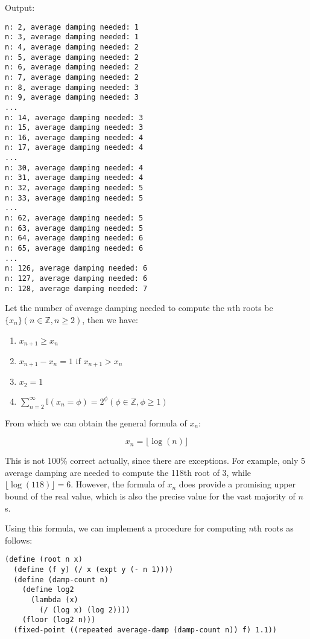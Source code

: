 \documentclass[../main.tex]{subfiles}
\begin{document}
Output:

\begin{lstlisting}
n: 2, average damping needed: 1
n: 3, average damping needed: 1
n: 4, average damping needed: 2
n: 5, average damping needed: 2
n: 6, average damping needed: 2
n: 7, average damping needed: 2
n: 8, average damping needed: 3
n: 9, average damping needed: 3
...
n: 14, average damping needed: 3
n: 15, average damping needed: 3
n: 16, average damping needed: 4
n: 17, average damping needed: 4
...
n: 30, average damping needed: 4
n: 31, average damping needed: 4
n: 32, average damping needed: 5
n: 33, average damping needed: 5
...
n: 62, average damping needed: 5
n: 63, average damping needed: 5
n: 64, average damping needed: 6
n: 65, average damping needed: 6
...
n: 126, average damping needed: 6
n: 127, average damping needed: 6
n: 128, average damping needed: 7
\end{lstlisting}

Let the number of average damping needed to
 compute the $n$th roots be
 $\{x_n\}(n\in\mathbb{Z},n\geq2)$, then we have:

\begin{enumerate}
\item $x_{n+1}\geq x_n$
\item $x_{n+1}-x_n=1$ if $x_{n+1}>x_n$
\item $x_2 = 1$
\item $\sum_{n=2}^\infty\mathbb{I}(x_n=\phi)=2^\phi(\phi\in\mathbb{Z},\phi\geq1)$
\end{enumerate}

From which we can obtain the general formula of $x_n$:

$$
x_n = \lfloor\log(n)\rfloor
$$

This is not 100\% correct actually, since there are
 exceptions. For example, only 5 average damping are
 needed to compute the 118th root of 3, while
 $\lfloor\log(118)\rfloor=6$. However, the formula
 of $x_n$ does provide a promising upper bound of
 the real value, which is also the precise value for
 the vast majority of $n$s.

Using this formula, we can implement a procedure for computing
 $n$th roots as follows:

\begin{lstlisting}
(define (root n x)
  (define (f y) (/ x (expt y (- n 1))))
  (define (damp-count n)
    (define log2
      (lambda (x)
        (/ (log x) (log 2))))
    (floor (log2 n)))
  (fixed-point ((repeated average-damp (damp-count n)) f) 1.1))
\end{lstlisting}
\end{document}
